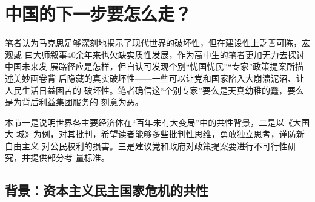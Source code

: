 \chapter{中国的下一步要怎么走？}


笔者认为马克思足够深刻地揭示了现代世界的破坏性，但在建设性上乏善可陈，宏观或
曰大师叙事40余年来也欠缺实质性发展，作为高中生的笔者更加无力去探讨中国未来发
展路径应是怎样，但自认可发现个别“忧国忧民”“专家”政策提案所描述美妙画卷背
后隐藏的真实破坏性——一些可以让党和国家陷入大崩溃泥沼、让人民生活日益困苦的
破坏性。笔者确信这“个别专家”要么是天真幼稚的蠢，要么是为背后利益集团服务的
刻意为恶。

本节一是说明世界各主要经济体在“百年未有大变局”中的共性背景，二是以《大国大
城》为例，对其批判，希望读者能够多些批判性思维，勇敢独立思考，谨防新自由主义
对公民权利的损害。三是建议党和政府对政策提案要进行不可行性研究，并提供部分考
量标准。


\section{背景：资本主义民主国家危机的共性}


